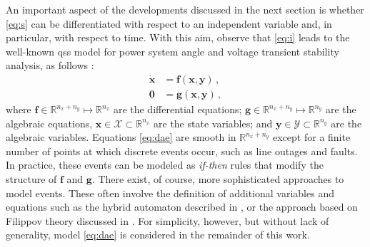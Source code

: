 \documentclass[journal, twocolumn, letter]{IEEEtran}
\newcommand{\bfg}[1]{\boldsymbol{#1}}
\newcommand{\xdot}{\dot{\bfg x}}
\begin{document}
An important aspect of the developments discussed in the next section
is whether \eqref{eq:s} can be differentiated with respect to an
independent variable and, in particular, with respect to time.  With
this aim, observe that \eqref{eq:i} leads to the well-known \ac{qss}
model for power system angle and voltage transient stability analysis,
as follows \cite{Sauer:1998, Milano:2010}: 
\begin{equation}
  \label{eq:dae}
  \begin{aligned}
    \xdot &= \bfg f (\bfg x, \bfg y) \, , \\
    \bfg 0 &= \bfg g (\bfg x, \bfg y) \, ,
  \end{aligned}
\end{equation}
where $\bfg f \in \mathbb{R}^{n_x + n_y} \mapsto \mathbb{R}^{n_x}$ are
the differential equations;
$\bfg g \in \mathbb{R}^{n_x + n_y} \mapsto \mathbb{R}^{n_y}$ are the
algebraic equations, $\bfg x \in \mathcal{X} \subset \mathbb{R}^{n_x}$
are the state variables; and
$\bfg y \in \mathcal{Y} \subset \mathbb{R}^{n_y}$ are the algebraic
variables.  Equations \eqref{eq:dae} are smooth in
$\mathbb{R}^{n_x + n_y}$ except for a finite number of points at which
discrete events occur, such as line outages and faults.  In practice,
these events can be modeled as \textit{if-then} rules that modify the
structure of $\bfg f$ and $\bfg g$.  There exist, of course, more
sophisticated approaches to model events.  These often involve the
definition of additional variables and equations such as the hybrid
automaton described in \cite{1275601}, or the approach based on
Filippov theory discussed in \cite{9415410}.  For simplicity,
however, but without lack of generality, model \eqref{eq:dae} is
considered in the remainder of this work. 
\end{document}
